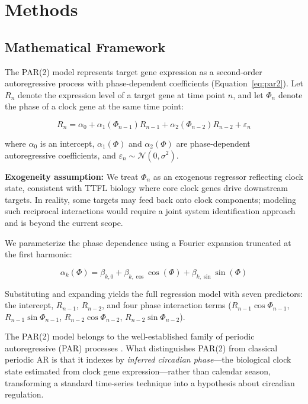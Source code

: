 \documentclass[11pt,letterpaper]{article}
\begin{document}
\section{Methods}

\subsection{Mathematical Framework}

The PAR(2) model represents target gene expression as a second-order autoregressive process with phase-dependent coefficients (Equation~\ref{eq:par2}). Let $R_n$ denote the expression level of a target gene at time point $n$, and let $\Phi_n$ denote the phase of a clock gene at the same time point:

\begin{equation}
R_n = \alpha_0 + \alpha_1(\Phi_{n-1})R_{n-1} + \alpha_2(\Phi_{n-2})R_{n-2} + \varepsilon_n
\label{eq:par2}
\end{equation}

where $\alpha_0$ is an intercept, $\alpha_1(\Phi)$ and $\alpha_2(\Phi)$ are phase-dependent autoregressive coefficients, and $\varepsilon_n \sim \mathcal{N}(0, \sigma^2)$.

\textbf{Exogeneity assumption:} We treat $\Phi_n$ as an exogenous regressor reflecting clock state, consistent with TTFL biology where core clock genes drive downstream targets. In reality, some targets may feed back onto clock components; modeling such reciprocal interactions would require a joint system identification approach and is beyond the current scope.

We parameterize the phase dependence using a Fourier expansion truncated at the first harmonic:

\begin{equation}
\alpha_k(\Phi) = \beta_{k,0} + \beta_{k,\cos}\cos(\Phi) + \beta_{k,\sin}\sin(\Phi)
\end{equation}

Substituting and expanding yields the full regression model with seven predictors: the intercept, $R_{n-1}$, $R_{n-2}$, and four phase interaction terms ($R_{n-1}\cos\Phi_{n-1}$, $R_{n-1}\sin\Phi_{n-1}$, $R_{n-2}\cos\Phi_{n-2}$, $R_{n-2}\sin\Phi_{n-2}$).

The PAR(2) model belongs to the well-established family of periodic autoregressive (PAR) processes \citep{box1994, hurd2007}. What distinguishes PAR(2) from classical periodic AR is that it indexes by \textit{inferred circadian phase}---the biological clock state estimated from clock gene expression---rather than calendar season, transforming a standard time-series technique into a hypothesis about circadian regulation.
\end{document}
